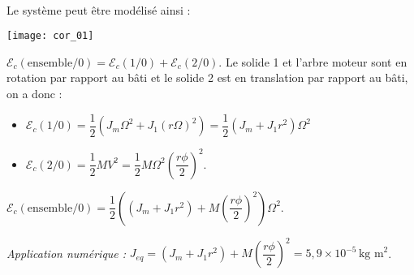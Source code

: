 \ifprof
\begin{corrige}~\\
Le système peut être modélisé ainsi :

\begin{center}
\texttt{[image: cor\_01]}
\end{center}

$\mathcal{E}_c\left(\text{ensemble}/0\right) = \mathcal{E}_c\left(1/0\right)+\mathcal{E}_c\left(2/0\right)$. Le solide 1 et l'arbre moteur sont en rotation par rapport au bâti et le solide 2 est en translation par rapport au bâti, on a donc : 
\begin{itemize}
\item $\mathcal{E}_c\left(1/0\right) = \dfrac{1}{2}\left( J_m \Omega^2 + J_1 \left(r\Omega\right)^2\right)= \dfrac{1}{2}\left( J_m  + J_1 r^2\right)\Omega^2$
\item $\mathcal{E}_c\left(2/0\right) = \dfrac{1}{2} M V^2 = \dfrac{1}{2} M \Omega^2  \left(\dfrac{r\phi}{2}\right)^2$.
\end{itemize}

$\mathcal{E}_c\left(\text{ensemble}/0\right) = \dfrac{1}{2}\left(\left( J_m  + J_1 r^2\right)+   M \left(\dfrac{r\phi}{2}\right)^2\right)\Omega^2  $.


\textit{Application numérique : }
$J_{eq}=\left( J_m  + J_1 r^2\right)+   M \left(\dfrac{r\phi}{2}\right)^2 =5,9\times 10^{-5} \, \text{kg m}^2$.
\end{corrige}
\else
\fi

\ifprof
\begin{corrige}~\\
\end{corrige}
\else
\fi


\ifprof
\begin{corrige}~\\
\end{corrige}
\else
\fi

